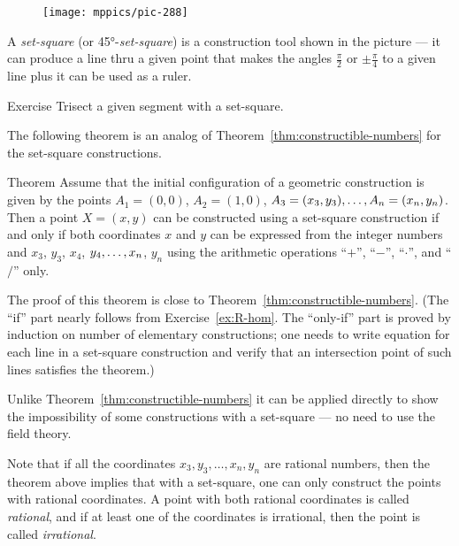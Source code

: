 {

\begin{wrapfigure}[5]{r}{26mm}
\vskip-12mm
\centering
\texttt{[image: mppics/pic-288]}
\end{wrapfigure}

A \emph{set-square} (or 45°-\emph{set-square}) is a construction tool shown in the picture ---
it can produce a line thru a given point
that makes the angles
$\tfrac\pi2$ or $\pm\tfrac\pi4$ 
to a given line plus it can be used as a ruler.

\begin{thm}{Exercise}\label{ex:trisect-set-square}
Trisect a given segment with a set-square.
\end{thm}

The following theorem is an analog of Theorem~\ref{thm:constructible-numbers} for the set-square constructions.

}

\begin{thm}{Theorem}\label{thm:set-square-constructible-numbers}
Assume that the initial configuration of a geometric construction is given by the points $A_1=(0,0)$, $A_2=(1,0)$, $A_3\z=(x_3,y_3),\z\dots,A_n=(x_n,y_n)$.
Then a point $X=(x,y)$ can be constructed using a set-square construction
if and only if both coordinates $x$ and $y$ can be expressed from the integer numbers and $x_3$, $y_3$, $x_4$, $y_4,\z\dots,x_n$, $y_n$ using the arithmetic operations ``$+$'', ``$-$'', ``$\cdot$'', and ``$/$'' only. 
\end{thm}

The proof of this theorem is close to Theorem~\ref{thm:constructible-numbers}.
(The ``if'' part nearly follows from Exercise~\ref{ex:R-hom}.
The ``only-if'' part is proved by induction on number of elementary constructions; one needs to write equation for each line in a set-square construction and verify that an intersection point of such lines satisfies the theorem.)

Unlike Theorem~\ref{thm:constructible-numbers} it can be applied directly to show the impossibility of some constructions with a set-square --- no need to use the field theory.

Note that if all the coordinates $x_3,y_3,\dots,x_n,y_n$ are rational numbers, then the theorem above implies that with a set-square, one can only construct the points with rational coordinates.
A point with both rational coordinates is called \emph{rational},
and if at least one of the coordinates is irrational, then the point is called \emph{irrational}.

